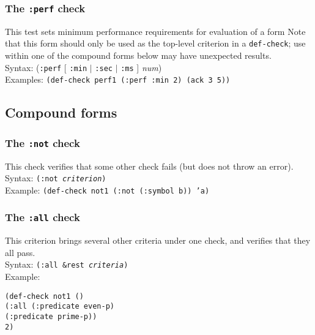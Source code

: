 \subsubsection{The \texttt{:perf} check}
This test sets minimum performance requirements for evaluation of a
form  Note that this form should only be
used as the top-level criterion in a \texttt{def-check};
use within one of the compound forms below may have
unexpected results.
\\ Syntax: (\texttt{:perf} [ \texttt{:min} $|$ \texttt{:sec} $|$ \texttt{:ms} ] \textit{num})
\\Examples: \texttt{(def-check perf1 (:perf :min 2) (ack 3 5))}

% 

\subsection{Compound forms}

\subsubsection{The \texttt{:not} check} 
This check verifies that some other check fails (but does not throw an
error).
\\ Syntax: \texttt{(:not \emph{criterion})}
\\ Example: \texttt{(def-check not1 (:not (:symbol b)) 'a)}

\subsubsection{The \texttt{:all} check} 
This criterion brings several other criteria under one check, and
verifies that they all pass.
\\ Syntax: \texttt{(:all \&rest \emph{criteria})}
\\ Example:
\begin{tabbing}
\texttt{(de}\=\texttt{f-}\=\texttt{check not1 ()}
\\ \>\>\texttt{(:all }\=\texttt{(:predicate even-p)}
\\ \>\>\>\texttt{(:predicate prime-p))}
\\ \>\texttt{2)}
\end{tabbing}

